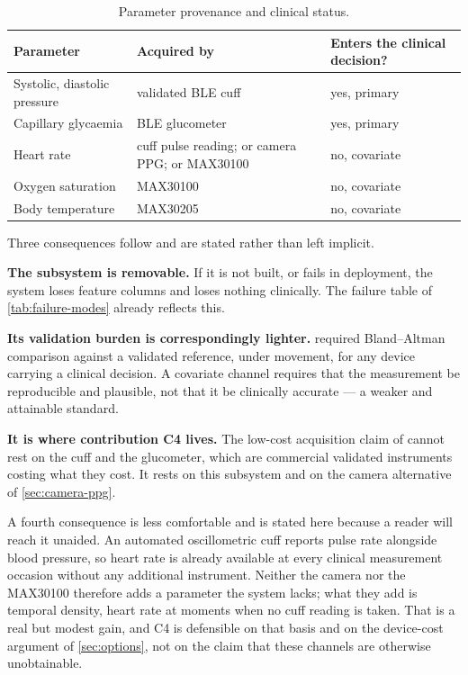 \documentclass[12pt,a4paper,oneside]{report}
\begin{document}
\begin{table}[htbp]
\centering\small
\caption{Parameter provenance and clinical status.}\label{tab:parameter-provenance}
\begin{tabularx}{\textwidth}{@{}>{\raggedright\arraybackslash}p{4.0cm} X >{\raggedright\arraybackslash}p{3.4cm}@{}}
\toprule
\textbf{Parameter} & \textbf{Acquired by} & \textbf{Enters the clinical decision?} \\
\midrule
Systolic, diastolic pressure & validated BLE cuff & yes, primary \\
Capillary glycaemia & BLE glucometer & yes, primary \\
Heart rate & cuff pulse reading; or camera PPG; or MAX30100 & no, covariate \\
Oxygen saturation & MAX30100 & no, covariate \\
Body temperature & MAX30205 & no, covariate \\
\bottomrule
\end{tabularx}
\end{table}

Three consequences follow and are stated rather than left implicit.

\textbf{The subsystem is removable.} If it is not built, or fails in deployment, the system loses feature columns and loses nothing clinically. The failure table of \cref{tab:failure-modes} already reflects this.

\textbf{Its validation burden is correspondingly lighter.}  required Bland--Altman comparison against a validated reference, under movement, for any device carrying a clinical decision. A covariate channel requires that the measurement be reproducible and plausible, not that it be clinically accurate --- a weaker and attainable standard.

\textbf{It is where contribution C4 lives.} The low-cost acquisition claim of \textcite{cadrage2026} cannot rest on the cuff and the glucometer, which are commercial validated instruments costing what they cost. It rests on this subsystem and on the camera alternative of \cref{sec:camera-ppg}.

A fourth consequence is less comfortable and is stated here because a reader will reach it unaided. An automated oscillometric cuff reports pulse rate alongside blood pressure, so heart rate is already available at every clinical measurement occasion without any additional instrument. Neither the camera nor the MAX30100 therefore adds a parameter the system lacks; what they add is temporal density, heart rate at moments when no cuff reading is taken. That is a real but modest gain, and C4 is defensible on that basis and on the device-cost argument of \cref{sec:options}, not on the claim that these channels are otherwise unobtainable.
\end{document}
